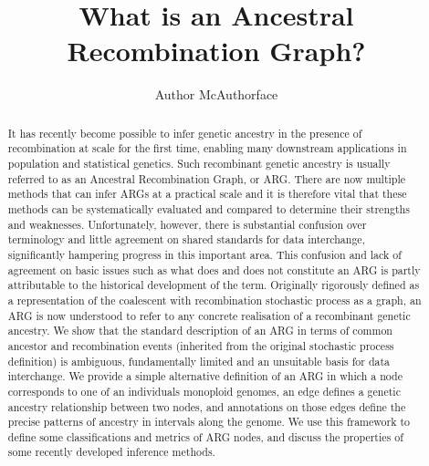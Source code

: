 \documentclass{article}
\begin{document}
\linenumbers
\title{What is an Ancestral Recombination Graph?}
\author{Author McAuthorface}

\maketitle

\begin{abstract}
It has recently become possible to infer genetic ancestry in the presence of
recombination at scale for the first time, enabling many
downstream applications in population and statistical genetics.
Such recombinant genetic ancestry is usually
referred to as an Ancestral Recombination Graph, or ARG.
There are now multiple methods that can infer ARGs at a practical scale
and it is therefore vital that these methods can be systematically evaluated
and compared to determine their strengths and weaknesses.
Unfortunately, however, there is substantial confusion over
terminology and little agreement on shared standards for data interchange,
significantly hampering progress in this important area.
This confusion and lack of agreement on basic issues such as what does and
does not constitute an ARG is partly attributable to the historical
development of the term.
Originally rigorously defined as
a representation of the coalescent with recombination
stochastic process as a graph, an ARG is now understood to refer to any
concrete realisation of a recombinant genetic ancestry.
We show that the standard description of an ARG
in terms of common ancestor and recombination events
(inherited from the original stochastic process definition) is
ambiguous, fundamentally limited and an unsuitable basis for data interchange.
We provide a simple alternative definition of an ARG in which a node
corresponds to one of an individuals monoploid genomes, an edge
defines a genetic ancestry relationship between two nodes,
and annotations on those edges define the precise patterns of
ancestry in intervals along the genome.
We use this framework to define some classifications and metrics of ARG nodes,
and discuss the properties of some recently developed inference methods.
\end{abstract}
\end{document}
